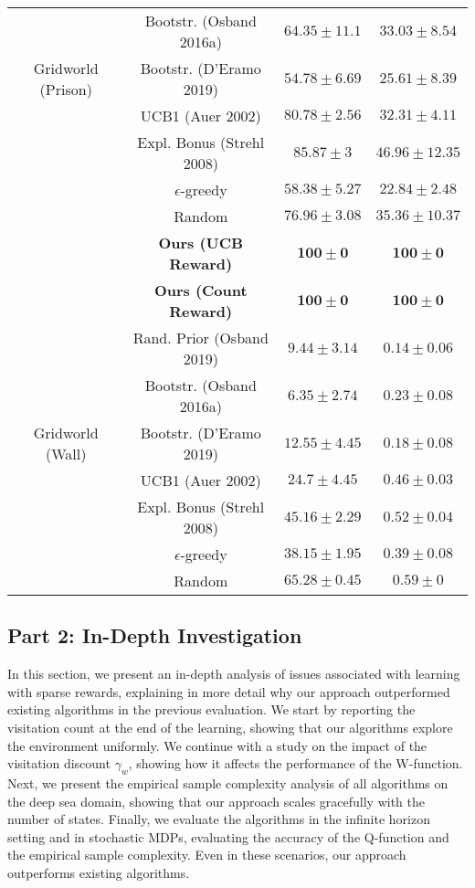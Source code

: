 \documentclass{article}
\begin{document}
\begin{table}
\begin{tabular}{ c | c | c c }
	 & Bootstr. (Osband 2016a) & $64.35 \pm 11.1$ & $33.03 \pm 8.54$ \\
	 Gridworld (Prison) & Bootstr. (D'Eramo 2019) & $54.78 \pm 6.69$ & $25.61 \pm 8.39$ \\
	 & UCB1 (Auer 2002) & $80.78 \pm 2.56$ & $32.31 \pm 4.11$ \\
	 & Expl. Bonus (Strehl 2008) & $85.87 \pm 3$ & $46.96 \pm 12.35$ \\
	 & $\epsilon$-greedy & $58.38 \pm 5.27$ & $22.84 \pm 2.48$ \\
	 & Random & $76.96 \pm 3.08$ & $35.36 \pm 10.37$ \\
	 \hline
	 & \textbf{Ours (UCB Reward)} & $\mathbf{100 \pm 0}$ & $\mathbf{100 \pm 0}$ \\
	 & \textbf{Ours (Count Reward)} & $\mathbf{100 \pm 0}$ & $\mathbf{100 \pm 0}$ \\
	 & Rand. Prior (Osband 2019) & $9.44 \pm 3.14$ & $0.14 \pm 0.06$ \\
	 & Bootstr. (Osband 2016a) & $6.35 \pm 2.74$ & $0.23 \pm 0.08$ \\
	 Gridworld (Wall) & Bootstr. (D'Eramo 2019) & $12.55 \pm 4.45$ & $0.18 \pm 0.08$ \\
	 & UCB1 (Auer 2002) & $24.7 \pm 4.45$ & $0.46 \pm 0.03$ \\
	 & Expl. Bonus (Strehl 2008) & $45.16 \pm 2.29$ & $0.52 \pm 0.04$ \\
	 & $\epsilon$-greedy & $38.15 \pm 1.95$ & $0.39 \pm 0.08$ \\
	 & Random & $65.28 \pm 0.45$ & $0.59 \pm 0$ \\
 \end{tabular}
\end{table}

 
\clearpage


\subsection{Part 2: In-Depth Investigation}
\label{ssec:eval_part2}
In this section, we present an in-depth analysis of issues associated with learning with sparse rewards, explaining in more detail why our approach outperformed existing algorithms in the previous evaluation.
We start by reporting the visitation count at the end of the learning, showing that our algorithms explore the environment uniformly. We continue with a study on the impact of the visitation discount $\gamma_w$, showing how it affects the performance of the W-function. Next, we present the empirical sample complexity analysis of all algorithms on the deep sea domain, showing that our approach scales gracefully with the number of states. Finally, we evaluate the algorithms in the infinite horizon setting and in stochastic MDPs, evaluating the accuracy of the Q-function and the empirical sample complexity. Even in these scenarios, our approach outperforms existing algorithms.
\end{document}
